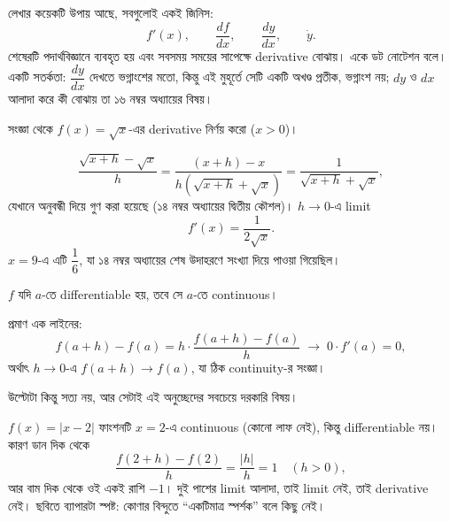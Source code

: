 \documentclass[11pt]{article}
\begin{document}
লেখার কয়েকটি উপায় আছে, সবগুলোই একই জিনিস:
\[
  f'(x), \qquad \frac{df}{dx}, \qquad \frac{dy}{dx}, \qquad \dot{y} .
\]
শেষেরটি পদার্থবিজ্ঞানে ব্যবহৃত হয় এবং সবসময় সময়ের সাপেক্ষে derivative বোঝায়। একে ডট নোটেশন বলে।
একটি সতর্কতা: $\dfrac{dy}{dx}$ দেখতে ভগ্নাংশের মতো, কিন্তু এই মুহূর্তে সেটি
একটি অখণ্ড প্রতীক, ভগ্নাংশ নয়; $dy$ ও $dx$ আলাদা করে কী বোঝায় তা ১৬ নম্বর
অধ্যায়ের বিষয়।

\begin{example}
সংজ্ঞা থেকে $f(x) = \sqrt{x}$-এর derivative নির্ণয় করো ($x > 0$)।
\end{example}

\begin{solbox}
\[
  \frac{\sqrt{x+h} - \sqrt{x}}{h}
  = \frac{(x+h) - x}{h\left( \sqrt{x+h} + \sqrt{x} \right)}
  = \frac{1}{\sqrt{x+h} + \sqrt{x}} ,
\]
যেখানে অনুবন্ধী দিয়ে গুণ করা হয়েছে (১৪ নম্বর অধ্যায়ের দ্বিতীয় কৌশল)।
$h \to 0$-এ limit
\[
  f'(x) = \frac{1}{2\sqrt{x}} .
\]
$x = 9$-এ এটি $\dfrac{1}{6}$, যা ১৪ নম্বর অধ্যায়ের শেষ উদাহরণে সংখ্যা
দিয়ে পাওয়া গিয়েছিল।
\end{solbox}

\begin{idea}
$f$ যদি $a$-তে differentiable হয়, তবে সে $a$-তে continuous।
\end{idea}

প্রমাণ এক লাইনের:
\[
  f(a+h) - f(a) = h \cdot \frac{f(a+h)-f(a)}{h}
  \;\longrightarrow\; 0 \cdot f'(a) = 0 ,
\]
অর্থাৎ $h \to 0$-এ $f(a+h) \to f(a)$, যা ঠিক continuity-র সংজ্ঞা।

উল্টোটা কিন্তু সত্য নয়, আর সেটাই এই অনুচ্ছেদের সবচেয়ে দরকারি বিষয়।

\begin{center}
\end{center}

$f(x) = |x-2|$ ফাংশনটি $x = 2$-এ continuous (কোনো লাফ নেই), কিন্তু
differentiable নয়। কারণ ডান দিক থেকে
\[
  \frac{f(2+h)-f(2)}{h} = \frac{|h|}{h} = 1 \quad (h > 0) ,
\]
আর বাম দিক থেকে ওই একই রাশি $-1$। দুই পাশের limit আলাদা, তাই limit নেই, তাই
derivative নেই। ছবিতে ব্যাপারটা স্পষ্ট: কোণার বিন্দুতে ``একটিমাত্র স্পর্শক''
বলে কিছু নেই।
\end{document}
